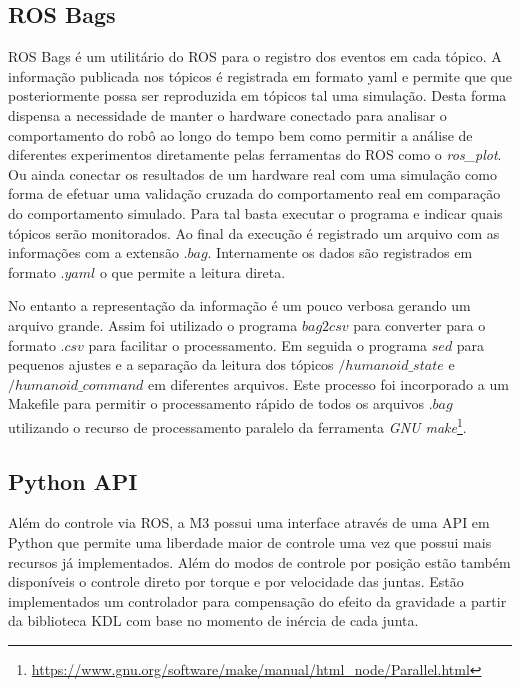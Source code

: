 \subsection{ROS Bags}

ROS Bags é um utilitário do ROS para o registro dos eventos em cada tópico. A informação publicada nos tópicos é registrada em formato yaml e permite que que posteriormente possa ser reproduzida em tópicos tal uma simulação. Desta forma dispensa a necessidade de manter o hardware conectado para analisar o comportamento do robô ao longo do tempo bem como permitir a análise de diferentes experimentos diretamente pelas ferramentas do ROS como o \textit{ros\_plot}. Ou ainda conectar os resultados de um hardware real com uma simulação como forma de efetuar uma validação cruzada do comportamento real em comparação do comportamento simulado. Para tal basta executar o programa e indicar quais tópicos serão monitorados. Ao final da execução é registrado um arquivo com as informações com a extensão $.bag$. Internamente os dados são registrados em formato $.yaml$ o que permite a leitura direta.

No entanto a representação da informação é um pouco verbosa gerando um arquivo grande. Assim foi utilizado o programa $bag2csv$ para converter para o formato $.csv$ para facilitar o processamento. Em seguida o programa $sed$ para pequenos ajustes e a separação da leitura dos tópicos  $/humanoid\_state$ e $/humanoid\_command$ em diferentes arquivos. Este processo foi incorporado a um Makefile para permitir o processamento rápido de todos os arquivos $.bag$ utilizando o recurso de processamento paralelo da ferramenta \textit{GNU make}\footnote{\url{https://www.gnu.org/software/make/manual/html_node/Parallel.html}}.

\subsection{Python API}

Além do controle via ROS, a M3 possui uma interface através de uma API em Python que permite uma liberdade maior de controle uma vez que possui mais recursos já implementados. Além do modos de controle por posição estão também disponíveis o controle direto por torque e por velocidade das juntas. Estão implementados um controlador para compensação do efeito da gravidade a partir da biblioteca KDL com base no momento de inércia de cada junta.

